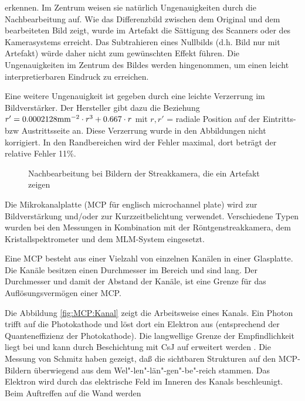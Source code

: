 erkennen. Im Zentrum weisen sie natürlich Ungenauigkeiten durch die
Nachbearbeitung auf. Wie das Differenzbild zwischen dem Original und
dem bearbeiteten Bild zeigt, wurde im Artefakt die Sättigung des
Scanners oder des Kamerasystems erreicht. Das Subtrahieren eines
Nullbilds (d.h. Bild nur mit Artefakt) würde daher nicht zum
gewünschten Effekt führen. Die Ungenauigkeiten im Zentrum des Bildes
werden hingenommen, um einen leicht interpretierbaren Eindruck zu
erreichen.
\par
Eine weitere Ungenauigkeit ist gegeben durch eine leichte Verzerrung im
Bildverstärker. Der Hersteller gibt dazu die Beziehung $r' = 0.0002128
{\rm mm}^{-2} \cdot r^3 + 0.667 \cdot r$ mit $r, r'$ = radiale Position
auf der Eintritts- bzw Austrittsseite an. Diese Verzerrung wurde in den
Abbildungen nicht korrigiert. In den Randbereichen wird der Fehler
maximal, dort beträgt der relative Fehler 11\%.
%
\par
\begin{figure}[H]
  \center
  \caption{Nachbearbeitung bei Bildern der Streakkamera, die ein Artefakt zeigen}
  \label{fig:bildbearbeitung}
\end{figure}
%
%
Die Mikrokanalplatte (MCP für englisch microchannel plate) wird zur
Bildverstärkung und/oder zur Kurzzeitbelichtung verwendet. Verschiedene
Typen wurden bei den Messungen in Kombination mit der
Röntgenstreakkamera, dem Kristallspektrometer und dem MLM-System
eingesetzt.
\par
Eine MCP \cite{wiza:79} besteht aus einer Vielzahl von einzelnen
Kanälen in einer Glasplatte. Die Kanäle besitzen einen Durchmesser im
Bereich  und sind  lang. Der
Durchmesser und damit der Abstand der Kanäle, ist eine Grenze für das
Auflösungsvermögen einer MCP.
\par
Die Abbildung \vref{fig:MCP:Kanal} zeigt die Arbeitsweise eines
Kanals. Ein Photon trifft auf die Photokathode und löst dort ein
Elektron aus (entsprechend der Quanteneffizienz der Photokathode).
Die langwellige Grenze der Empfindlichkeit liegt bei  und kann durch Beschichtung mit CsJ auf  erweitert werden \cite{martin:82}. Die Messung von
Schmitz \cite{schmitz:diplom} haben gezeigt, daß die sichtbaren
Strukturen auf den MCP-Bildern überwiegend aus dem
Wel"-len"-län"-gen"-be"-reich  stammen. Das
Elektron wird durch das elektrische Feld im Inneren des Kanals
beschleunigt. Beim Auftreffen auf die Wand werden
